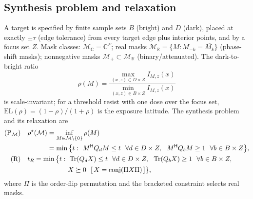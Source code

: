 \documentclass[11pt,a4paper]{article}
\newcommand{\R}{\mathbb{R}}\newcommand{\C}{\mathbb{C}}\newcommand{\PSD}{\succeq 0}
\DeclareMathOperator{\Tr}{Tr}\DeclareMathOperator{\rank}{rank}\DeclareMathOperator{\conj}{conj}
\newcommand{\I}{I}\newcommand{\rhostar}{\rho^{\star}}
\newcommand{\EL}{\mathrm{EL}}
\begin{document}
\subsection{Synthesis problem and relaxation}
A target is specified by finite sample sets $B$ (bright) and $D$ (dark), placed at exactly $\pm\tau$ (edge tolerance) from every target edge plus interior points, and by a focus set $Z$. Mask classes: $\mathcal M_\C=\C^F$; real masks $\mathcal M_\R=\{M:M_{-k}=\overline{M_k}\}$ (phase-shift masks); nonnegative masks $\mathcal M_+\subset\mathcal M_\R$ (binary/attenuated). The dark-to-bright ratio
\begin{equation}\label{eq:rho}
\rho(M)=\frac{\max_{(x,z)\in D\times Z}\I_{M,z}(x)}{\min_{(x,z)\in B\times Z}\I_{M,z}(x)}
\end{equation}
is scale-invariant; for a threshold resist with one dose over the focus set, $\EL(\rho)=(1-\rho)/(1+\rho)$ is the exposure latitude. The synthesis problem and its relaxation are
\begin{align}
(\mathrm P_{\mathcal M})\quad & \rhostar(\mathcal M)=\inf_{M\in\mathcal M\setminus\{0\}}\rho(M)\nonumber\\
 &\hphantom{\rhostar(\mathcal M)}= \min\big\{t:\ M^{\mathsf H}Q_dM\le t\ \ \forall d\in D\times Z,\ \ M^{\mathsf H}Q_bM\ge1\ \ \forall b\in B\times Z\big\},\\
(\mathrm R)\quad & t_R=\min\big\{t:\ \Tr(Q_dX)\le t\ \ \forall d\in D\times Z,\ \ \Tr(Q_bX)\ge1\ \ \forall b\in B\times Z,\nonumber\\
 &\hphantom{t_R=\min\big\{t:\ }X\PSD\ \ [\,X=\conj(\Pi X\Pi)\,]\big\},\label{eq:R}
\end{align}
where $\Pi$ is the order-flip permutation and the bracketed constraint selects real masks.
\end{document}

